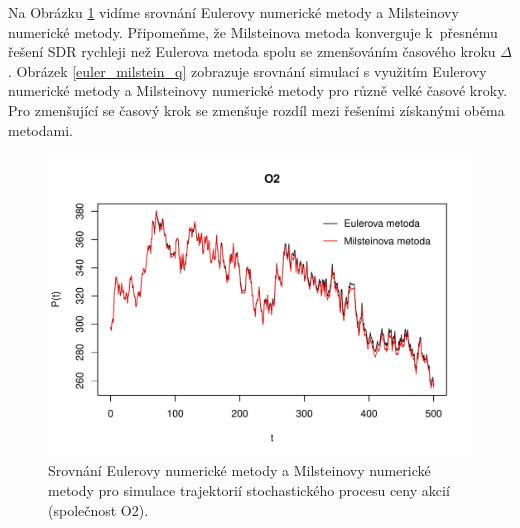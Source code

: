 \documentclass[a4paper,12pt]{report}
\theoremstyle{definition} \newtheorem{definice}[veta]{Definice}
\theoremstyle{remark}
\begin{document}
Na Obrázku \ref{euler_milstein} vidíme srovnání Eulerovy numerické metody a Milsteinovy numerické metody.
Připomeňme, že Milsteinova metoda konverguje k~přesnému řešení SDR rychleji než Eulerova metoda spolu se zmenšováním časového kroku $\Delta$.
Obrázek \ref{euler_milstein_q} zobrazuje srovnání simulací s využitím Eulerovy numerické metody a Milsteinovy numerické metody pro různě velké časové kroky.
Pro zmenšující se časový krok se zmenšuje rozdíl mezi řešeními získanými oběma metodami. 

\begin{figure}[!htbp]
  \centering 
	\includegraphics[width=13.5cm, clip, trim= 0 15 25 50]{IMG/e_m_o2_v2.pdf}
  \caption{Srovnání Eulerovy numerické metody a Milsteinovy numerické metody pro simulace trajektorií stochastického procesu ceny akcií (společnost O2).}  \label{euler_milstein}
\end{figure}
\end{document}
